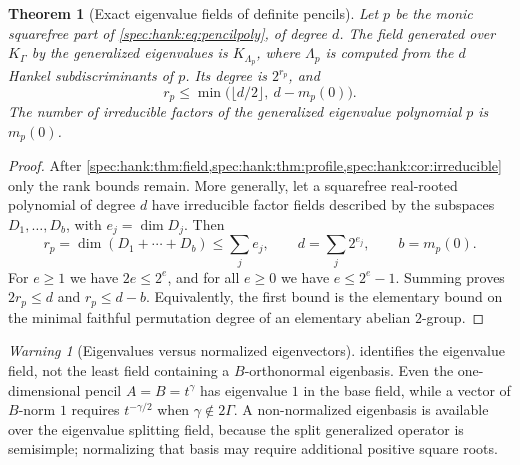 \documentclass[11pt,a4paper]{article}
\numberwithin{equation}{section}
\newtheorem{theorem}{Theorem}[section]
\theoremstyle{definition}
\theoremstyle{remark}
\newtheorem{warning}[warning]{Warning}
\begin{document}
\begin{theorem}[Exact eigenvalue fields of definite pencils]\label{spec:hank:thm:pencil}
Let $p$ be the monic squarefree part of \eqref{spec:hank:eq:pencilpoly}, of
degree $d$. The field generated over $K_\Gamma$ by the generalized
eigenvalues is $K_{\Lambda_p}$, where $\Lambda_p$ is computed from the $d$
Hankel subdiscriminants of $p$. Its degree is $2^{r_p}$, and
\[
 r_p\le\min\bigl(\lfloor d/2\rfloor,\ d-m_p(0)\bigr).
\]
The number of irreducible factors of the generalized eigenvalue polynomial
$p$ is $m_p(0)$.
\end{theorem}
\begin{proof}
After \cref{spec:hank:thm:field,spec:hank:thm:profile,spec:hank:cor:irreducible}
only the rank bounds remain. More generally, let a squarefree real-rooted
polynomial of degree $d$ have irreducible factor fields described by the
subspaces $D_1,\ldots,D_b$, with $e_j=\dim D_j$. Then
\[
 r_p=\dim(D_1+\cdots+D_b)\le\sum_je_j,
 \qquad d=\sum_j2^{e_j},\qquad b=m_p(0).
\]
For $e\ge1$ we have $2e\le2^e$, and for all $e\ge0$ we have $e\le2^e-1$.
Summing proves $2r_p\le d$ and $r_p\le d-b$. Equivalently, the first bound is
the elementary bound on the minimal faithful permutation degree of an
elementary abelian $2$-group.
\end{proof}

\begin{warning}[Eigenvalues versus normalized eigenvectors]\label{spec:hank:warn:normalization}
 identifies the eigenvalue field, not the least
field containing a $B$-orthonormal eigenbasis. Even the one-dimensional
pencil $A=B=t^\gamma$ has eigenvalue $1$ in the base field, while a vector of
$B$-norm $1$ requires $t^{-\gamma/2}$ when $\gamma\notin2\Gamma$. A
non-normalized eigenbasis is available over the eigenvalue splitting field,
because the split generalized operator is semisimple; normalizing that basis
may require additional positive square roots.
\end{warning}
\end{document}
